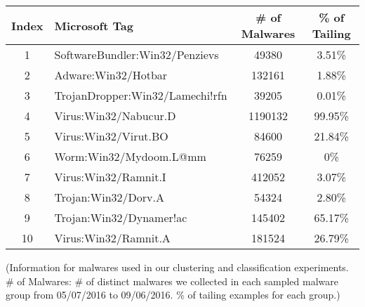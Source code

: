 \begin{table}
  \centering
  \scriptsize
  {
  \begin{tabular}{clcc}
    \toprule
{\bf Index} & {\bf Microsoft Tag} & {\bf \# of Malwares} & {\bf \% of Tailing} \\
\midrule                                                                                                                                                                                                                                           
1  &  SoftwareBundler:Win32/Penzievs 	& 49380	   & 3.51\%  \\
2  &  Adware:Win32/Hotbar               & 132161   & 1.88\%  \\
3  &  TrojanDropper:Win32/Lamechi!rfn	& 39205	   & 0.01\%  \\
4  &  Virus:Win32/Nabucur.D	            & 1190132  & 99.95\% \\
5  &  Virus:Win32/Virut.BO	            & 84600	   & 21.84\% \\
6  &  Worm:Win32/Mydoom.L@mm	        & 76259	   & 0\%     \\
7  &  Virus:Win32/Ramnit.I              & 412052   & 3.07\%  \\
8  &  Trojan:Win32/Dorv.A               & 54324    & 2.80\%  \\
9  &  Trojan:Win32/Dynamer!ac           & 145402   & 65.17\% \\
10 &  Virus:Win32/Ramnit.A              & 181524   & 26.79\% \\   

\bottomrule
   \end{tabular}
   }
{\footnotesize{(Information for malwares used in our clustering and classification experiments. \# of Malwares: \# of distinct malwares we collected in each sampled malware group from 05/07/2016 to 09/06/2016. \% of tailing examples for each group.)}}
\end{table}



